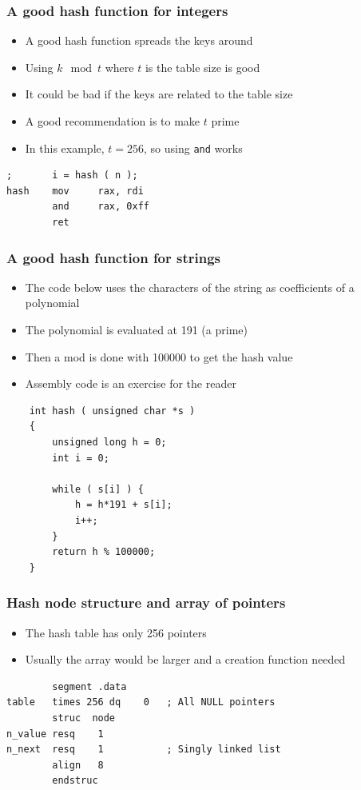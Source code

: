 \documentclass{beamer}
\begin{document}
\begin{frame}[fragile]
    \frametitle{A good hash function for integers}
    \begin{itemize}
        \item A good hash function spreads the keys around
        \item Using $k \mod t$ where $t$ is the table size is good
        \item It could be bad if the keys are related to the table size
        \item A good recommendation is to make $t$ prime
        \item In this example, $t=256$, so using {\tt and} works
    \end{itemize}

\begin{verbatim}
;       i = hash ( n );
hash    mov     rax, rdi
        and     rax, 0xff
        ret
\end{verbatim}
\end{frame}

\begin{frame}[fragile]
    \frametitle{A good hash function for strings}
    \begin{itemize}
        \item The code below uses the characters of the string as
              coefficients of a polynomial
        \item The polynomial is evaluated at 191 (a prime)
        \item Then a mod is done with 100000 to get the hash value
        \item Assembly code is an exercise for the reader
    \end{itemize}

\begin{verbatim}
    int hash ( unsigned char *s )
    {
        unsigned long h = 0;
        int i = 0;
        
        while ( s[i] ) {
            h = h*191 + s[i];
            i++;
        }
        return h % 100000;
    }
\end{verbatim}
\end{frame}


\begin{frame}[fragile]
    \frametitle{Hash node structure and array of pointers}
    \begin{itemize}
        \item The hash table has only 256 pointers
        \item Usually the array would be larger and a creation function needed
    \end{itemize}

\begin{verbatim}
        segment .data
table   times 256 dq    0   ; All NULL pointers
        struc  node
n_value resq    1
n_next  resq    1           ; Singly linked list
        align   8
        endstruc
\end{verbatim}
\end{frame}
\end{document}

